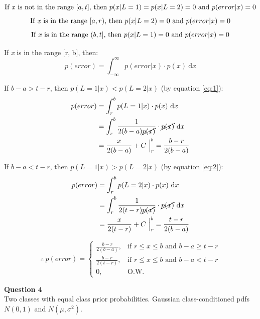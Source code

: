 \documentclass[12pt,A4]{article}
\begin{document}
$$\textrm{If \textit{x} is not in the range $[a, t]$, then } p(x|L=1) = p(x|L=2) = 0 \textrm{ and } p(error|x) = 0$$
$$\textrm{If \textit{x} is in the range $[a, r)$, then } p(x|L=2) = 0 \textrm{ and } p(error|x) = 0$$
$$\textrm{If \textit{x} is in the range $(b, t]$, then } p(x|L=1) = 0 \textrm{ and } p(error|x) = 0$$

If \textit{x} is in the range [r, b], then:
$$p(error) = \int_{-\infty}^{\infty} p(error|x) \cdot p(x)\ \mathrm{d}x$$

If $b-a > t-r$, then $p(L=1|x) < p(L=2|x)$ (by equation \ref{eq:1}):
\begin{align*}
    p(error) &= \int_{r}^{b} p(L=1|x) \cdot p(x)\ \mathrm{d}x \\
    &= \int_{r}^{b} \frac{1}{2(b-a)\cancel{p(x)}} \cdot \cancel{p(x)}\ \mathrm{d}x \\
    &= \frac{x}{2(b-a)} + C \ \Big|_r^b = \frac{b-r}{2(b-a)}
\end{align*}

If $b-a < t-r$, then $p(L=1|x) > p(L=2|x)$ (by equation \ref{eq:2}):
\begin{align*}
    p(error) &= \int_{r}^{b} p(L=2|x) \cdot p(x)\ \mathrm{d}x \\
    &= \int_{r}^{b} \frac{1}{2(t-r)\cancel{p(x)}} \cdot \cancel{p(x)}\ \mathrm{d}x \\
    &= \frac{x}{2(t-r)} + C \ \Big|_r^b = \frac{t-r}{2(b-a)}
\end{align*}

\begin{equation*}
    \therefore \ \boxed{p(error) = \begin{cases}
    \frac{b-r}{2(b-a)}, & \text{if $r\leq x\leq b$ and $b-a \geq t-r$} \\
    \frac{b-r}{2(t-r)}, & \text{if $r\leq x\leq b$ and $b-a < t-r$} \\
    0,                  & \text{O.W.}
    \end{cases}}
\end{equation*}

\textbf{Question 4} \\
Two classes with equal class prior probabilities. Gaussian class-conditioned pdfs $N(0, 1)$ and $N(\mu, \sigma^2)$.
\end{document}
